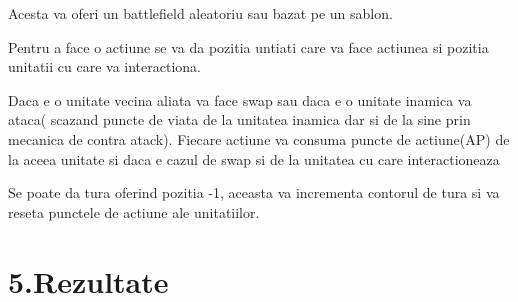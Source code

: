 \documentclass{article} %
\begin{document}
\noindent Acesta va oferi un battlefield aleatoriu sau bazat pe un sablon.

\noindent Pentru a face o actiune se va da pozitia untiati care va face actiunea si pozitia unitatii cu care va interactiona.

\noindent Daca e o unitate vecina aliata va face swap sau daca e o unitate inamica va ataca( scazand puncte de viata de la unitatea inamica dar si de la sine prin mecanica de contra atack). Fiecare actiune va consuma puncte de actiune(AP) de la aceea unitate si daca e cazul de swap si de la unitatea cu care interactioneaza

\noindent Se poate da tura oferind pozitia -1, aceasta va incrementa contorul de tura si va reseta punctele de actiune ale unitatiilor.

\noindent 
\section{5.Rezultate}

\noindent 
\end{document}
